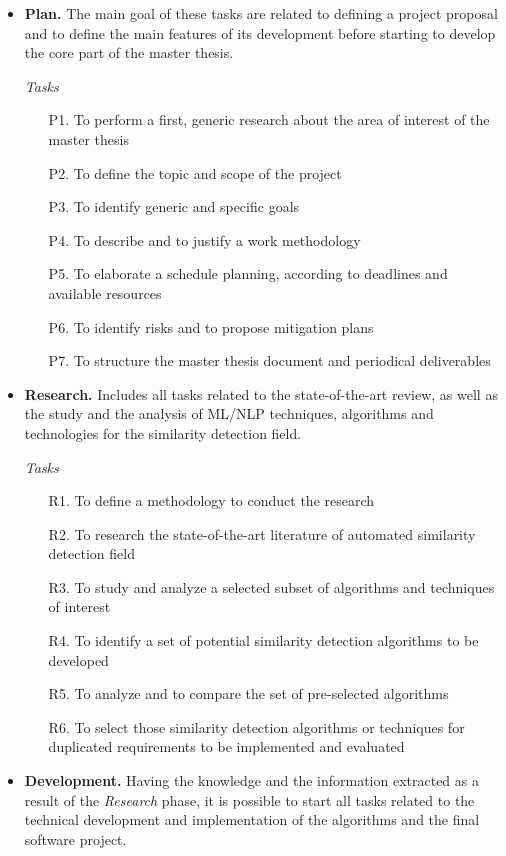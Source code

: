 \documentclass[11pt]{article}
\begin{document}
\begin{itemize}
\item \textbf{Plan.} The main goal of these tasks are related to defining a project proposal and to define the main features of its development before starting to develop the core part of the master thesis.

\textit{Tasks}
\begin{enumerate}
\item[P1.] To perform a first, generic research about the area of interest of the master thesis
\item[P2.] To define the topic and scope of the project
\item[P3.] To identify generic and specific goals
\item[P4.] To describe and to justify a work methodology
\item[P5.] To elaborate a schedule planning, according to deadlines and available resources
\item[P6.] To identify risks and to propose mitigation plans
\item[P7.] To structure the master thesis document and periodical deliverables
\end{enumerate}
\item \textbf{Research.} Includes all tasks related to the state-of-the-art review, as well as the study and the analysis of ML/NLP techniques, algorithms and technologies for the similarity detection field.

\textit{Tasks}
\begin{enumerate}
\item[R1.] To define a methodology to conduct the research
\item[R2.] To research the state-of-the-art literature of automated similarity detection field
\item[R3.] To study and analyze a selected subset of algorithms and techniques of interest
\item[R4.] To identify a set of potential similarity detection algorithms to be developed 
\item[R5.] To analyze and to compare the set of pre-selected algorithms
\item[R6.] To select those similarity detection algorithms or techniques for duplicated requirements to be implemented and evaluated
\end{enumerate}
\item \textbf{Development.} Having the knowledge and the information extracted as a result of the \textit{Research} phase, it is possible to start all tasks related to the technical development and implementation of the algorithms and the final software project.


\end{itemize}
\end{document}
